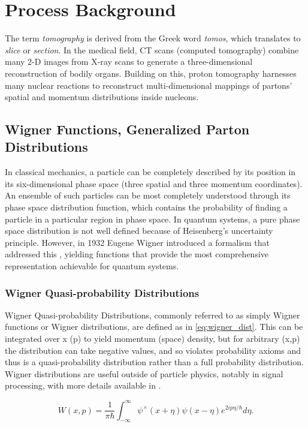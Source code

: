 \section{Process Background}
  The term \textit{tomography} is derived from the Greek word \textit{tomos}, which translates to \textit{slice} or \textit{section}. In the medical field, CT scans (computed tomography) combine many 2-D images from X-ray scans to generate a three-dimensional reconstruction of bodily organs. Building on this, proton tomography harnesses many nuclear reactions to reconstruct multi-dimensional mappings of partons' spatial and momentum distributions inside nucleons. 


    \subsection{Wigner Functions, Generalized Parton Distributions}

        In classical mechanics, a particle can be completely described by its position in its six-dimensional phase space (three spatial and three momentum coordinates). An ensemble of such particles can be most completely understood through its phase space distribution function, which contains the probability of finding a particle in a particular region in phase space. In quantum systems, a pure phase space distribution is not well defined because of Heisenberg's uncertainty principle. However, in 1932 Eugene Wigner introduced a formalism that addressed this \parencite{Wigner1932OnEquilibrium}, yielding functions that provide the most comprehensive representation achievable for quantum systems.
        
        
        \subsubsection*{Wigner Quasi-probability Distributions}
             Wigner Quasi-probability Distributions, commonly referred to as simply Wigner functions or Wigner distributions, are defined as in \eqref{eq:wigner_dist}. This can be integrated over x (p) to yield momentum (space) density, but for arbitrary (x,p) the distribution can take negative values, and so violates probability axioms and thus is a quasi-probability distribution rather than a full probability distribution. Wigner distributions are useful outside of particle physics, notably in signal processing, with more details available in \parencite{Hillery1984DistributionFundamentals}.

             \begin{equation}\label{eq:wigner_dist}
                W(x,p) = \frac{1}{\pi\hbar} \int_{-\infty}^{\infty} \psi^\times (x+\eta) \psi(x-\eta) e^{2ip \eta/\hbar} d\eta.
            \end{equation}

